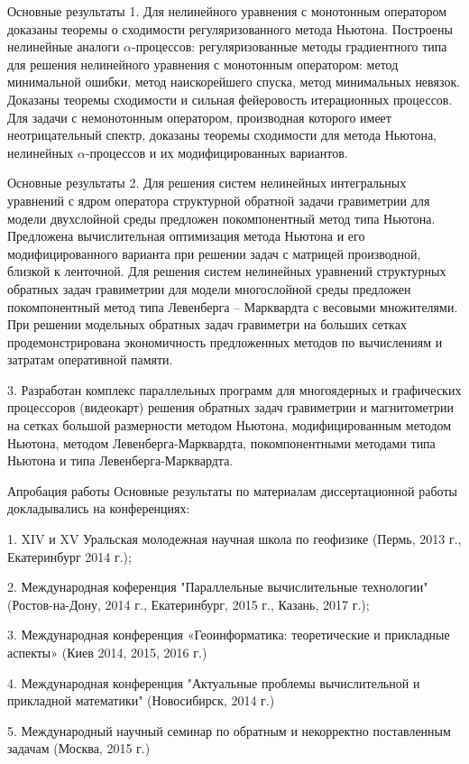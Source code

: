 \documentclass[10pt,pdf, mathserif, hyperref={unicode}]{beamer}
\begin{document}
\begin{frame}{Основные результаты}
	1. Для нелинейного уравнения с монотонным оператором доказаны теоремы о сходимости регуляризованного метода Ньютона. 
	Построены нелинейные аналоги $\alpha$-процессов:  регуляризованные методы градиентного типа для решения нелинейного уравнения с монотонным оператором: метод минимальной ошибки, метод наискорейшего спуска, метод минимальных невязок. Доказаны теоремы сходимости и сильная фейеровость итерационных процессов. Для задачи с немонотонным оператором, производная которого имеет неотрицательный спектр, доказаны теоремы сходимости для метода  Ньютона, нелинейных $\alpha$-процессов и их модифицированных вариантов.
	  
	
\end{frame}

\begin{frame}{Основные результаты}
	2. Для решения систем нелинейных интегральных уравнений с 
	ядром оператора структурной обратной задачи гравиметрии для 
	модели двухслойной среды предложен покомпонентный метод 
	типа Ньютона. Предложена вычислительная оптимизация метода 
	Ньютона и его модифицированного варианта при решении задач 
	с матрицей производной, близкой к ленточной. Для решения систем 
	нелинейных уравнений структурных обратных задач гравиметрии 
	для модели многослойной среды предложен покомпонентный
	метод типа Левенберга – Марквардта с весовыми множителями.
	При решении модельных обратных задач гравиметри на больших 
	сетках продемонстрирована экономичность предложенных методов
	по вычислениям и затратам оперативной памяти.
	
	3. Разработан комплекс параллельных программ для многоядерных и графических процессоров (видеокарт) решения обратных задач гравиметрии и магнитометрии на сетках большой размерности методом Ньютона, модифицированным методом Ньютона,  методом Левенберга-Марквардта, покомпонентными методами типа Ньютона и типа Левенберга-Марквардта. 
\end{frame}
	
\begin{frame}{Апробация работы}
	Основные результаты по материалам диссертационной работы докладывались на конференциях:
	
	
	1. XIV и XV Уральская молодежная научная школа по геофизике (Пермь, 2013 г., Екатеринбург 2014 г.);
	
	2. Международная коференция "Параллельные вычислительные технологии" (Ростов-на-Дону, 2014 г., Екатеринбург, 2015 г., Казань, 2017 г.);
	
	3. Международная конференция «Геоинформатика: теоретические и прикладные аспекты» (Киев 2014, 2015, 2016 г.)
	
	4. Международная конференция "Актуальные проблемы вычислительной и прикладной математики" (Новосибирск, 2014 г.)
	
	5. Международный научный семинар по обратным и некорректно поставленным задачам (Москва, 2015 г.)
\end{frame}
\end{document}
